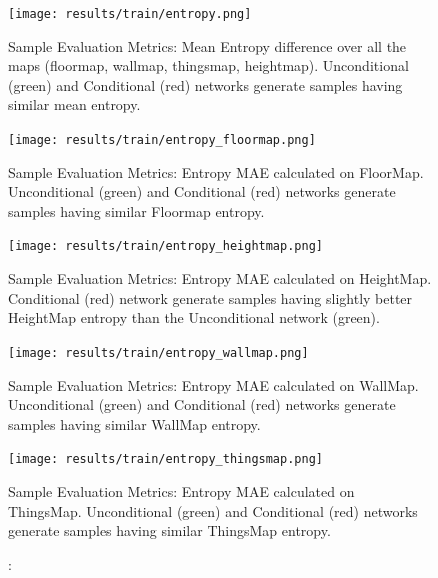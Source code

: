\begin{figure}[!htb] 
	\begin{minipage}[b]{\linewidth}
		\centering
		\texttt{[image: results/train/entropy.png]} 
		\caption[Sample Evaluation Metrics: Entropy]: {Sample Evaluation Metrics: Mean Entropy difference over all the maps (floormap, wallmap, thingsmap, heightmap). Unconditional (green) and Conditional (red) networks generate samples having similar mean entropy. }
		\label{fig:train-entropy-mean}
	\end{minipage}
	
	\begin{minipage}[b]{0.45\linewidth}
		\centering
		\texttt{[image: results/train/entropy\_floormap.png]} 
		\caption[Sample Evaluation Metrics: Entropy (Floormap)]: {Sample Evaluation Metrics: Entropy MAE calculated on FloorMap. Unconditional (green) and Conditional (red) networks generate samples having similar Floormap entropy.}
		\label{fig:train-entropy-floormap}
	\end{minipage}
	\hfil
	\begin{minipage}[b]{0.45\linewidth}
		\centering
		\texttt{[image: results/train/entropy\_heightmap.png]} 
		\caption[Sample Evaluation Metrics: Entropy (HeightMap)]: {Sample Evaluation Metrics: Entropy MAE calculated on HeightMap. Conditional (red) network generate samples having slightly better HeightMap entropy than the Unconditional network (green).}
		\label{fig:train-entropy-heightmap}
	\end{minipage}

	\begin{minipage}[b]{0.45\linewidth}
		\centering
		\texttt{[image: results/train/entropy\_wallmap.png]} 
		\caption[Sample Evaluation Metrics: Entropy (WallMap)]: {Sample Evaluation Metrics: Entropy MAE calculated on WallMap. Unconditional (green) and Conditional (red) networks generate samples having similar WallMap entropy.}
		\label{fig:train-entropy-wallmap}
	\end{minipage}
	\hfil
	\begin{minipage}[b]{0.45\linewidth}
		\centering
		\texttt{[image: results/train/entropy\_thingsmap.png]} 
		\caption[Sample Evaluation Metrics: Entropy (ThingsMap)]: {Sample Evaluation Metrics: Entropy MAE calculated on ThingsMap. Unconditional (green) and Conditional (red) networks generate samples having similar ThingsMap entropy.}
		\label{fig:train-entropy-thingsmap}
	\end{minipage}
\end{figure}


